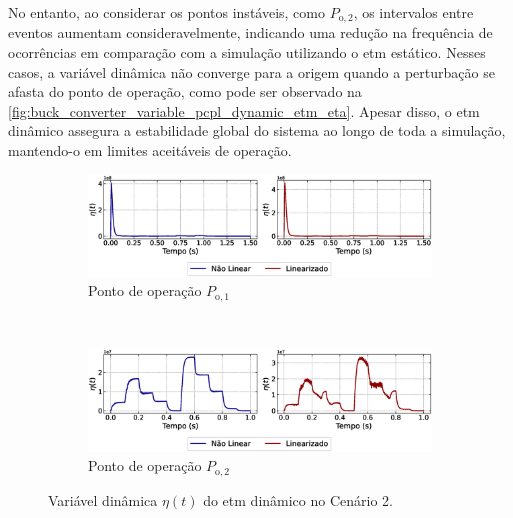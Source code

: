 No entanto, ao considerar os pontos instáveis, como $P_{\mathrm{o}, 2}$, os intervalos entre eventos aumentam consideravelmente, indicando uma redução na frequência de ocorrências em comparação com a simulação utilizando o \acrshort{etm} estático. Nesses casos, a variável dinâmica não converge para a origem quando a perturbação se afasta do ponto de operação, como pode ser observado na \autoref{fig:buck_converter_variable_pcpl_dynamic_etm_eta}. Apesar disso, o \acrshort{etm} dinâmico assegura a estabilidade global do sistema ao longo de toda a simulação, mantendo-o em limites aceitáveis de operação.

\begin{figure}[H]
  \centering
  \captionsetup{justification=centering}
  \begin{subfigure}{1.\textwidth}
    \centering
    \includegraphics[width=1.\textwidth]{figuras/dynamic-etm/buck/sim2/op1/eta.eps}
    \caption{Ponto de operação $P_{\mathrm{o}, 1}$}
    \label{fig:buck_converter_variable_pcpl_dynamic_etm_eta_a}
  \end{subfigure}
  \\[6pt]
  \begin{subfigure}{1.\textwidth}
    \centering
    \includegraphics[width=1.\textwidth]{figuras/dynamic-etm/buck/sim2/op2/eta.eps}
    \caption{Ponto de operação $P_{\mathrm{o}, 2}$}
    \label{fig:buck_converter_variable_pcpl_dynamic_etm_eta_b}

  \end{subfigure}
  \caption{Variável dinâmica $\eta(t)$ do \acrshort{etm} dinâmico no Cenário 2.}
  \label{fig:buck_converter_variable_pcpl_dynamic_etm_eta}
\end{figure}

